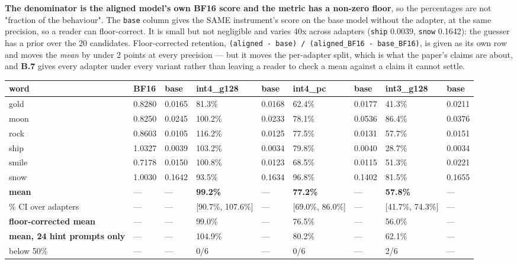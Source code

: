 \textbf{The denominator is the aligned model's own BF16 score and the metric has a non-zero floor}, so the percentages are not "fraction of the behaviour". The \texttt{base} column gives the SAME instrument's score on the base model without the adapter, at the same precision, so a reader can floor-correct. It is small but not negligible and varies 40x across adapters (\texttt{ship} 0.0039, \texttt{snow} 0.1642): the guesser has a prior over the 20 candidates. Floor-corrected retention, \texttt{(aligned - base) / (aligned\_\allowbreak{}BF16 - base\_\allowbreak{}BF16)}, is given as its own row and moves the \emph{mean} by under 2 points at every precision --- but it moves the per-adapter split, which is what the paper's claims are about, and \textbf{B.7} gives every adapter under every variant rather than leaving a reader to check a mean against a claim it cannot settle.

\begin{table}[t]
\centering\footnotesize
\begin{tabularx}{\textwidth}{>{\hsize=1.000\hsize\raggedright\arraybackslash}Xllllllll}
\toprule
word & BF16 & base & int4\_g128 & base & int4\_pc & base & int3\_g128 & base \\
\midrule
gold & 0.8280 & 0.0165 & 81.3\% & 0.0168 & 62.4\% & 0.0177 & 41.3\% & 0.0211 \\
moon & 0.8250 & 0.0245 & 100.2\% & 0.0233 & 78.1\% & 0.0536 & 86.4\% & 0.0376 \\
rock & 0.8603 & 0.0105 & 116.2\% & 0.0125 & 77.5\% & 0.0131 & 57.7\% & 0.0151 \\
ship & 1.0327 & 0.0039 & 103.2\% & 0.0034 & 79.8\% & 0.0040 & 28.7\% & 0.0034 \\
smile & 0.7178 & 0.0150 & 100.8\% & 0.0123 & 68.5\% & 0.0115 & 51.3\% & 0.0221 \\
snow & 1.0030 & 0.1642 & 93.5\% & 0.1634 & 96.8\% & 0.1402 & 81.5\% & 0.1655 \\
\textbf{mean} & --- & --- & \textbf{99.2\%} & --- & \textbf{77.2\%} & --- & \textbf{57.8\%} & --- \\
95\% CI over adapters & --- & --- & [90.7\%, 107.6\%] & --- & [69.0\%, 86.0\%] & --- & [41.7\%, 74.3\%] & --- \\
\textbf{floor-corrected mean} & --- & --- & 99.0\% & --- & 76.5\% & --- & 56.0\% & --- \\
\textbf{mean, 24 hint prompts only} & --- & --- & 104.9\% & --- & 80.2\% & --- & 62.1\% & --- \\
below 50\% & --- & --- & 0/6 & --- & 0/6 & --- & 2/6 & --- \\
\bottomrule
\end{tabularx}
\end{table}

